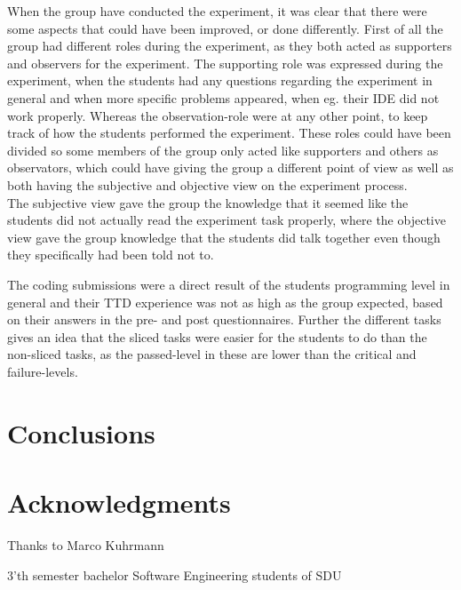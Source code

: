 \documentclass{sig-alternate-05-2015}
\begin{document}
When the group have conducted the experiment, it was clear that there were some aspects that could have been improved, or done differently. First of all the group had different roles during the experiment, as they both acted as supporters and observers for the experiment. The supporting role was expressed during the experiment, when the students had any questions regarding the experiment in general and when more specific problems appeared, when eg. their IDE did not work properly. Whereas the observation-role were at any other point, to keep track of how the students performed the experiment. These roles could have been divided so some members of the group only acted like supporters and others as observators, which could have giving the group a different point of view as well as both having the subjective and objective view on the experiment process.\\

The subjective view gave the group the knowledge that it seemed like the students did not actually read the experiment task properly, where the objective view gave the group knowledge that the students did talk together even though they specifically had been told not to.

The coding submissions were a direct result of the students programming level in general and their TTD experience was not as high as the group expected, based on their answers in the pre- and post questionnaires. Further the different tasks gives an idea that the sliced tasks were easier for the students to do than the non-sliced tasks, as the passed-level in these are lower than the critical and failure-levels.

\section{Conclusions}

\section{Acknowledgments}

Thanks to Marco Kuhrmann

3'th semester bachelor Software Engineering students of SDU
\end{document}
